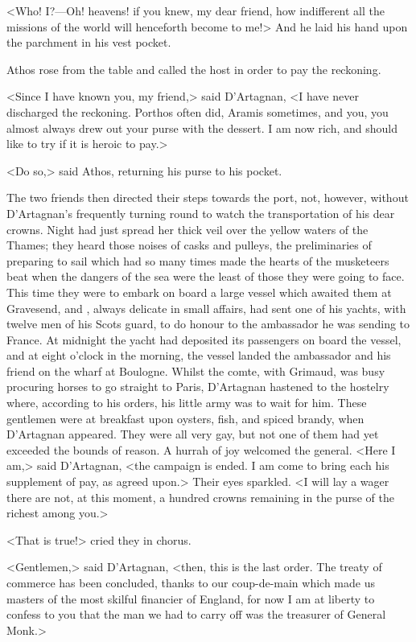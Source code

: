 <Who! I\@?—Oh! heavens! if you knew, my dear friend, how indifferent all the missions of the world will henceforth become to me!> And he laid his hand upon the parchment in his vest pocket.

Athos rose from the table and called the host in order to pay the reckoning.

<Since I have known you, my friend,> said D'Artagnan, <I have never discharged the reckoning. Porthos often did, Aramis sometimes, and you, you almost always drew out your purse with the dessert. I am now rich, and should like to try if it is heroic to pay.>

<Do so,> said Athos, returning his purse to his pocket.

The two friends then directed their steps towards the port, not, however, without D'Artagnan's frequently turning round to watch the transportation of his dear crowns. Night had just spread her thick veil over the yellow waters of the Thames; they heard those noises of casks and pulleys, the preliminaries of preparing to sail which had so many times made the hearts of the musketeers beat when the dangers of the sea were the least of those they were going to face. This time they were to embark on board a large vessel which awaited them at Gravesend, and , always delicate in small affairs, had sent one of his yachts, with twelve men of his Scots guard, to do honour to the ambassador he was sending to France. At midnight the yacht had deposited its passengers on board the vessel, and at eight o'clock in the morning, the vessel landed the ambassador and his friend on the wharf at Boulogne. Whilst the comte, with Grimaud, was busy procuring horses to go straight to Paris, D'Artagnan hastened to the hostelry where, according to his orders, his little army was to wait for him. These gentlemen were at breakfast upon oysters, fish, and spiced brandy, when D'Artagnan appeared. They were all very gay, but not one of them had yet exceeded the bounds of reason. A hurrah of joy welcomed the general. <Here I am,> said D'Artagnan, <the campaign is ended. I am come to bring each his supplement of pay, as agreed upon.> Their eyes sparkled. <I will lay a wager there are not, at this moment, a hundred crowns remaining in the purse of the richest among you.>

<That is true!> cried they in chorus.

<Gentlemen,> said D'Artagnan, <then, this is the last order. The treaty of commerce has been concluded, thanks to our coup-de-main which made us masters of the most skilful financier of England, for now I am at liberty to confess to you that the man we had to carry off was the treasurer of General Monk.>

